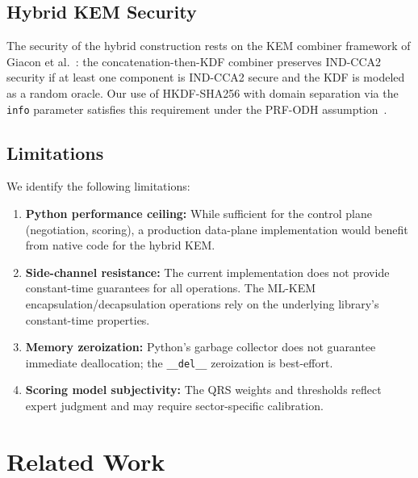\documentclass[conference,10pt]{IEEEtran}
\begin{document}
\subsection{Hybrid KEM Security}

The security of the hybrid construction rests on the KEM combiner
framework of Giacon et al.~\cite{giacon2018}: the concatenation-then-KDF
combiner preserves IND-CCA2 security if at least one component is
IND-CCA2 secure and the KDF is modeled as a random oracle. Our use of
HKDF-SHA256 with domain separation via the \texttt{info} parameter
satisfies this requirement under the PRF-ODH
assumption~\cite{brendel2022}.

\subsection{Limitations}

We identify the following limitations:

\begin{enumerate}[leftmargin=*]
\item \textbf{Python performance ceiling:} While sufficient for the
  control plane (negotiation, scoring), a production data-plane
  implementation would benefit from native code for the hybrid KEM.

\item \textbf{Side-channel resistance:} The current implementation does
  not provide constant-time guarantees for all operations. The ML-KEM
  encapsulation/decapsulation operations rely on the underlying library's
  constant-time properties.

\item \textbf{Memory zeroization:} Python's garbage collector does not
  guarantee immediate deallocation; the \texttt{\_\_del\_\_} zeroization
  is best-effort.

\item \textbf{Scoring model subjectivity:} The QRS weights and
  thresholds reflect expert judgment and may require sector-specific
  calibration.
\end{enumerate}

\section{Related Work}\label{sec:related}
\end{document}

